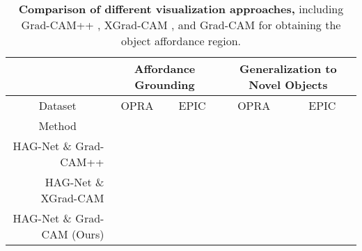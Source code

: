 \documentclass[journal,twoside]{IEEEtran}
\begin{document}
\begin{table*}[t]
\caption{\textbf{Comparison of different visualization approaches,} including Grad-CAM++ \cite{chattopadhay2018grad}, XGrad-CAM \cite{fu2020axiom}, and Grad-CAM \cite{selvaraju2017grad} for obtaining the object affordance region.
}
  \begin{center}
  \small
  \renewcommand{\arraystretch}{1.}
  \renewcommand{\tabcolsep}{1.pt}
  \begin{tabular}{r|cccc|cccc|cccc|cccc}
    \hline\toprule
    \multicolumn{1}{c|}{\quad} & \multicolumn{8}{c|}{\textbf{Affordance Grounding}} & \multicolumn{8}{c}{\textbf{Generalization to Novel Objects}} \\ 
    \hline
    \multicolumn{1}{c|}{Dataset} & \multicolumn{4}{c|}{OPRA \cite{demo2vec2018cvpr}} & \multicolumn{4}{c|}{EPIC \cite{Damen2018EPICKITCHENS}} & \multicolumn{4}{c|}{OPRA \cite{demo2vec2018cvpr}} & \multicolumn{4}{c}{EPIC \cite{Damen2018EPICKITCHENS}}\\ 
    \hline
    \multicolumn{1}{c|}{Method} & \emph{} & \emph{} & \emph{} & \emph{} & \emph{} & \emph{} & \emph{} &  \emph{} & \emph{} & \emph{} & \emph{} & \emph{} & \emph{} & \emph{} & \emph{} & \emph{} \\ 
    \hline
   HAG-Net \& Grad-CAM++ \cite{chattopadhay2018grad} &  &  &  &   &  &  &  &  &  &  &  &  &  &  &  &  \\
   HAG-Net \& XGrad-CAM \cite{fu2020axiom} &  &  &  &   &  &  &  &  &  &   &  &  &  &  &  &  \\
   \hline
   \rowcolor{mygray}
   HAG-Net \& Grad-CAM (Ours) &  &  &  &  &  &  &  &  &  &  &  &  &  &  &  &     \\
    \hline\bottomrule
    \end{tabular}
    \end{center}
  \label{Table:4}
  \end{table*}
  
\end{document}

